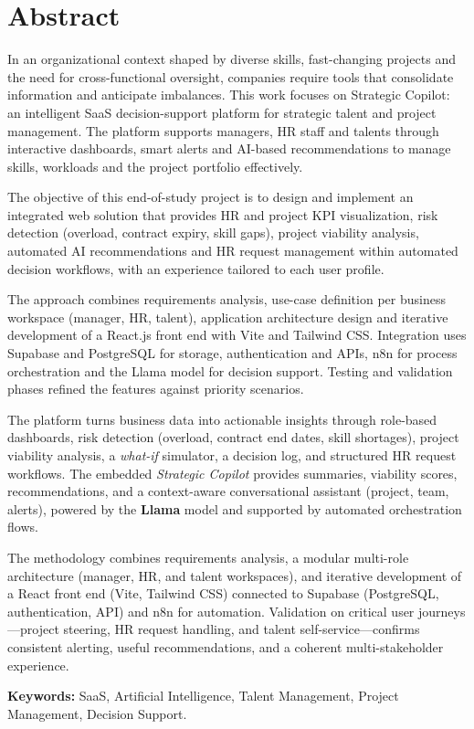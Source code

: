 \chapter*{Abstract}

In an organizational context shaped by diverse skills, fast-changing projects and the need for cross-functional oversight, companies require tools that consolidate information and anticipate imbalances. This work focuses on Strategic Copilot: an intelligent SaaS decision-support platform for strategic talent and project management. The platform supports managers, HR staff and talents through interactive dashboards, smart alerts and AI-based recommendations to manage skills, workloads and the project portfolio effectively.

The objective of this end-of-study project is to design and implement an integrated web solution that provides HR and project KPI visualization, risk detection (overload, contract expiry, skill gaps), project viability analysis, automated AI recommendations and HR request management within automated decision workflows, with an experience tailored to each user profile.

The approach combines requirements analysis, use-case definition per business workspace (manager, HR, talent), application architecture design and iterative development of a React.js front end with Vite and Tailwind CSS. Integration uses Supabase and PostgreSQL for storage, authentication and APIs, n8n for process orchestration and the Llama model for decision support. Testing and validation phases refined the features against priority scenarios.

The platform turns business data into actionable insights through role-based dashboards, risk detection (overload, contract end dates, skill shortages), project viability analysis, a \emph{what-if} simulator, a decision log, and structured HR request workflows. The embedded \emph{Strategic Copilot} provides summaries, viability scores, recommendations, and a context-aware conversational assistant (project, team, alerts), powered by the \textbf{Llama} model and supported by automated orchestration flows.

The methodology combines requirements analysis, a modular multi-role architecture (manager, HR, and talent workspaces), and iterative development of a React front end (Vite, Tailwind CSS) connected to Supabase (PostgreSQL, authentication, API) and n8n for automation. Validation on critical user journeys---project steering, HR request handling, and talent self-service---confirms consistent alerting, useful recommendations, and a coherent multi-stakeholder experience.

\textbf{Keywords:} SaaS, Artificial Intelligence, Talent Management, Project Management, Decision Support.

\clearpage
\newpage